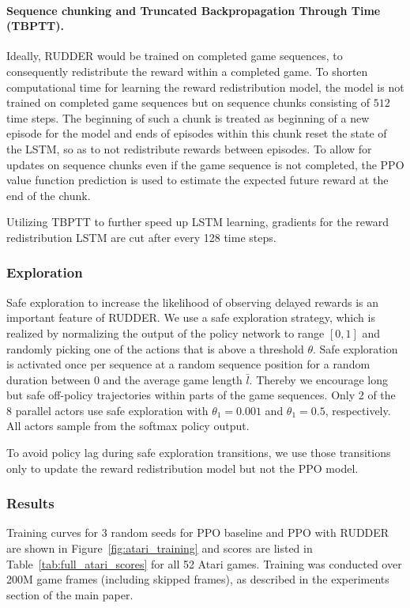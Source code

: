 \documentclass{article}
\begin{document}
\begin{appendices}
\paragraph{Sequence chunking and Truncated Backpropagation Through Time (TBPTT).}
Ideally, RUDDER would be trained on completed game sequences,
to consequently redistribute the reward within a completed game.
To shorten computational time for learning the reward redistribution model,
the model is not trained on completed game sequences
but on sequence chunks consisting of $512$ time steps.
The beginning of such a chunk is treated as beginning of a new episode for the model
and ends of episodes within this chunk reset the state of the LSTM,
so as to not redistribute rewards between episodes.
To allow for updates on sequence chunks even if the game sequence is not completed,
the PPO value function prediction is used to estimate the expected future reward at the end of the chunk.

Utilizing TBPTT to further speed up LSTM learning,
gradients for the reward redistribution LSTM are cut after every 128 time steps.




\subsubsection{Exploration}
\label{sec:Aatari-exploration}
Safe exploration to increase the likelihood of observing 
delayed rewards is an important feature of RUDDER.
We use a safe exploration strategy, which is realized by normalizing the output 
of the policy network to range $[0,1]$ and randomly picking one of the actions 
that is above a threshold $\theta$. 
Safe exploration is activated once per sequence at a random sequence position 
for a random duration between 0 and the average game length $\bar{l}$. 
Thereby we encourage long but safe off-policy trajectories within parts of the game sequences.
Only 2 of the 8 parallel actors use safe exploration with $\theta_1 = 0.001$ and $\theta_1 = 0.5$, respectively.
All actors sample from the softmax policy output.

To avoid policy lag during safe exploration transitions,
we use those transitions only to update
the reward redistribution model but not the PPO model.


\subsubsection{Results}
Training curves for 3 random seeds for PPO baseline and PPO with RUDDER are shown in Figure~\ref{fig:atari_training} and scores are listed in Table~\ref{tab:full_atari_scores} for all 52 Atari games. Training was conducted over 200M game frames (including skipped frames), as described in the experiments section of the main paper. 


\end{appendices}
\end{document}
